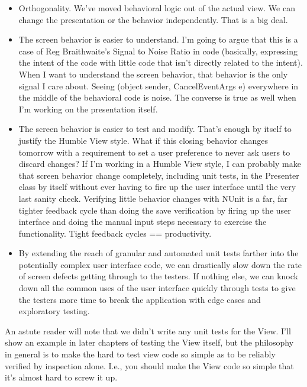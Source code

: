 \documentclass{article}
\begin{document}
{ \begin{itemize}
    \item  Orthogonality.  We've moved behavioral logic out of the actual view.  We can change the presentation or the behavior independently.  That is a big deal.   \vspace{5pt}
 \item  The screen behavior is easier to understand.  I'm going to argue that this is a case of Reg Braithwaite's Signal to Noise Ratio in code (basically, expressing the intent of the code with little code that isn't directly related to the intent).  When I want to understand the screen behavior, that behavior is the only signal I care about.  Seeing (object sender, CancelEventArgs e) everywhere in the middle of the behavioral code is noise.  The converse is true as well when I'm working on the presentation itself.  \vspace{5pt}
 \item  The screen behavior is easier to test and modify.  That's enough by itself to justify the Humble View style.  What if this closing behavior changes tomorrow with a requirement to set a user preference to never ask users to discard changes?  If I'm working in a Humble View style, I can probably make that screen behavior change completely, including unit tests, in the Presenter class by itself without ever having to fire up the user interface until the very last sanity check.  Verifying little behavior changes with NUnit is a far, far tighter feedback cycle than doing the save verification by firing up the user interface and doing the manual input steps necessary to exercise the functionality.  Tight feedback cycles == productivity.   \vspace{5pt}
 \item  By extending the reach of granular and automated unit tests farther into the potentially complex user interface code, we can drastically slow down the rate of screen defects getting through to the testers.  If nothing else, we can knock down all the common uses of the user interface quickly through tests to give the testers more time to break the application with edge cases and exploratory testing.  \vspace{5pt}
 \end{itemize}
 

An astute reader will note that we didn't write any unit tests for the View.  I'll show an example in later chapters of testing the View itself, but the philosophy in general is to make the hard to test view code so simple as to be reliably verified by inspection alone.  I.e., you should make the View code so simple that it's almost hard to screw it up. 

}
\end{document}
